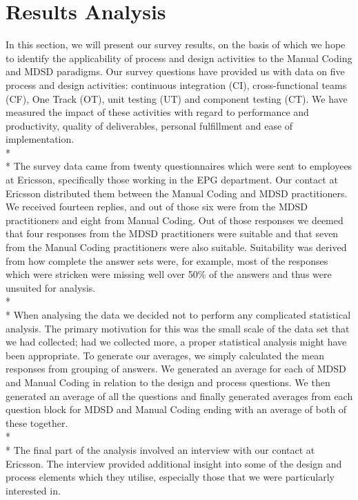 \documentclass[final_report_innit.tex]{subfiles}
\begin{document}
\section{Results Analysis}

In this section, we will present our survey results, on the basis of which we hope to identify the applicability of process and design activities to the Manual Coding and MDSD paradigms. Our survey questions have provided us with data on five process and design activities: continuous integration (CI), cross-functional teams (CF), One Track (OT), unit testing (UT) and component testing (CT). We have measured the impact of these activities with regard to performance and productivity, quality of deliverables, personal fulfillment and ease of implementation.
\\* 
\\* 
The survey data came from twenty questionnaires which were sent to employees at Ericsson, specifically those working in the EPG department. Our contact at Ericsson distributed them between the Manual Coding and MDSD practitioners. We received fourteen replies, and out of those six were from the MDSD practitioners and eight from Manual Coding. Out of those responses we deemed that four responses from the MDSD practitioners were suitable and that seven from the Manual Coding practitioners were also suitable. Suitability was derived from how complete the answer sets were, for example, most of the responses which were stricken were missing well over 50\% of the answers and thus were unsuited for analysis.
\\* 
\\* 
When analysing the data we decided not to perform any complicated statistical analysis. The primary motivation for this was the small scale of the data set that we had collected; had we collected more, a proper statistical analysis might have been appropriate. To generate our averages, we simply calculated the mean responses from grouping of answers. We generated an average for each of MDSD and Manual Coding in relation to the design and process questions. We then generated an average of all the questions and finally generated averages from each question block for MDSD and Manual Coding ending with an average of both of these together.
\\* 
\\* 
The final part of the analysis involved an interview with our contact at Ericsson. The interview provided additional insight into some of the design and process elements which they utilise, especially those that we were particularly interested in.
\end{document}
